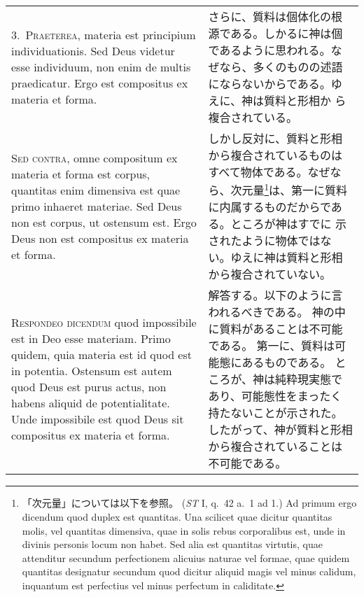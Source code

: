 \documentclass[10pt]{jsarticle} %
\begin{document}
\begin{longtable}{p{21em}p{21em}}
\\


3.~\textsc{Praeterea}, materia est principium individuationis. Sed Deus
 videtur esse individuum, non enim de multis praedicatur. Ergo est
 compositus ex materia et forma.

&

さらに、質料は個体化の根源である。しかるに神は個であるように思われる。な
 ぜなら、多くのものの述語にならないからである。ゆえに、神は質料と形相か
 ら複合されている。

\\


\textsc{Sed contra}, omne compositum ex materia et forma est corpus,
 quantitas enim dimensiva est quae primo inhaeret materiae. Sed Deus non
 est corpus, ut ostensum est. Ergo Deus non est compositus ex materia et
 forma.

&


しかし反対に、質料と形相から複合されているものはすべて物体である。なぜな
 ら、次元量\footnote{「次元量」については以下を参照。
(\textit{ST} I, q.~42 a.~1 ad 1.) Ad primum ergo dicendum quod duplex
 est quantitas. Una scilicet quae dicitur quantitas molis, vel quantitas
 dimensiva, quae in solis rebus corporalibus est, unde in divinis
 personis locum non habet. Sed alia est quantitas virtutis, quae
 attenditur secundum perfectionem alicuius naturae vel formae, quae
 quidem quantitas designatur secundum quod dicitur aliquid magis vel
 minus calidum, inquantum est perfectius vel minus perfectum in
 caliditate.}は、第一に質料に内属するものだからである。ところが神はすでに
 示されたように物体ではない。ゆえに神は質料と形相から複合されていない。

\\



\textsc{Respondeo dicendum} quod impossibile est in Deo esse materiam.
Primo quidem, quia materia est id quod est in potentia.
Ostensum est autem quod Deus est purus actus, non habens aliquid de
 potentialitate.
Unde impossibile est quod Deus sit compositus ex materia et forma.

&

解答する。以下のように言われるべきである。
神の中に質料があることは不可能である。
第一に、質料は可能態にあるものである。
ところが、神は純粋現実態であり、可能態性をまったく持たないことが示された。
したがって、神が質料と形相から複合されていることは不可能である。


\\


\end{longtable}
\end{document}
